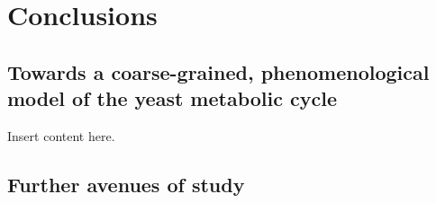 \chapter{Conclusions}
\label{ch:concl}

\section{Towards a coarse-grained, phenomenological model of the yeast metabolic cycle}
\label{sec:concl-coarse}

Insert content here.

\section{Further avenues of study}
\label{sec:concl-further}
